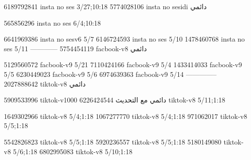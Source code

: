 
6189792841 insta no ses
3/27;10:18
5774028106 insta no sesidi
دائمي


565856296 insta no ses
6/4;10:18

6641969386 insta no sesv6
5/7
6146724593 insta no ses
5/10
1478460768 insta no ses
5/11
------------
5754454119 facbook-v8
دائمي

5129560572 facbook-v9
5/21
7110424166 facbook-v9
5/4
1433414033 facbook-v9
5/5
6230449023 facbook-v9
5/6
6974639363 facbook-v9
5/14
--------------
2027888642 tiktok-v8
دائمي

5909533996 tiktok-v1000
دائمي مع التحديث
6226424544 tiktok-v8
5/11;1:18

1649302966 tiktok-v8
5/4;1:18
1067277770 tiktok-v8
5/4;1:18
971062017 tiktok-v8
5/5;1:18

5542826823 tiktok-v8
5/5;1:18
5920236557 tiktok-v8
5/5;1:18
5180149080 tiktok-v8
5/6;1:18
6802995083 tiktok-v8
5/10;1:18

